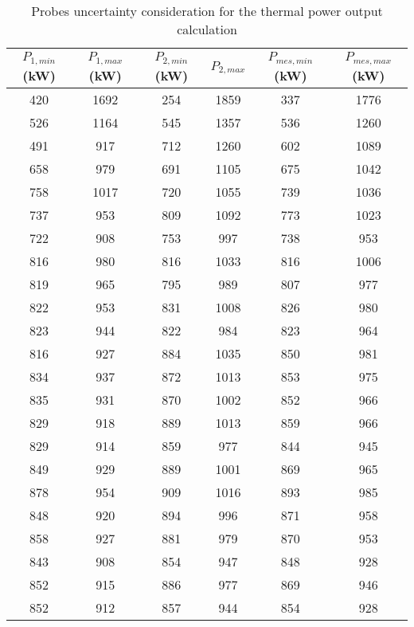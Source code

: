 \begin{table}[!htb]
    \centering
		\begin{tabular}{cccccc}
        \hline
		$P_{1, min}$ (kW) & $P_{1, max}$ (kW) & $P_{2, min}$ (kW) & $P_{2, max}$ & $P_{mes, min}$ (kW) & $P_{mes, max}$ (kW) \\ \hline\hline
		420    & 1692   & 254    & 1859   & 337      & 1776     \\
		526    & 1164   & 545    & 1357   & 536      & 1260     \\
		491    & 917    & 712    & 1260   & 602      & 1089     \\
		658    & 979    & 691    & 1105   & 675      & 1042     \\
		758    & 1017   & 720    & 1055   & 739      & 1036     \\
		737    & 953    & 809    & 1092   & 773      & 1023     \\
		722    & 908    & 753    & 997    & 738      & 953      \\
		816    & 980    & 816    & 1033   & 816      & 1006     \\
		819    & 965    & 795    & 989    & 807      & 977      \\
		822    & 953    & 831    & 1008   & 826      & 980      \\
		823    & 944    & 822    & 984    & 823      & 964      \\
		816    & 927    & 884    & 1035   & 850      & 981      \\
		834    & 937    & 872    & 1013   & 853      & 975      \\
		835    & 931    & 870    & 1002   & 852      & 966      \\
		829    & 918    & 889    & 1013   & 859      & 966      \\
		829    & 914    & 859    & 977    & 844      & 945      \\
		849    & 929    & 889    & 1001   & 869      & 965      \\
		878    & 954    & 909    & 1016   & 893      & 985      \\
		848    & 920    & 894    & 996    & 871      & 958      \\
		858    & 927    & 881    & 979    & 870      & 953      \\
		843    & 908    & 854    & 947    & 848      & 928      \\
		852    & 915    & 886    & 977    & 869      & 946      \\
		852    & 912    & 857    & 944    & 854      & 928     
		\end{tabular}
        \caption{Probes uncertainty consideration for the thermal power output calculation}\label{tab:data_power}
\end{table}





\
